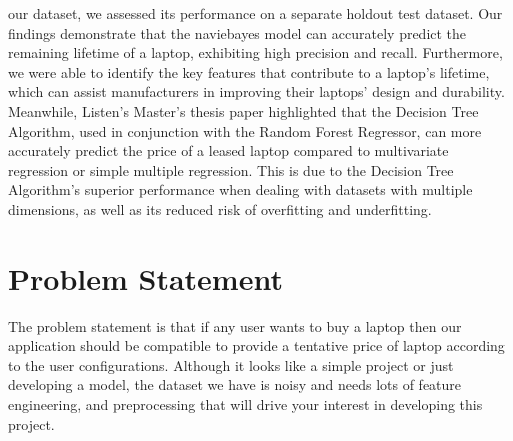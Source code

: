 \documentclass[
11pt, %
english, %
singlespacing, %
headsepline, %
]{MastersDoctoralThesis} %
\begin{document}
our dataset, we assessed its performance on a separate holdout test dataset. Our findings demonstrate that the naviebayes model can accurately predict 
the remaining lifetime of a laptop, exhibiting high precision and recall. Furthermore, we were able to identify the key features that contribute to a laptop's 
lifetime, which can assist manufacturers in improving their laptops' design and durability. Meanwhile, Listen's Master's thesis paper highlighted that the 
Decision Tree Algorithm, used in conjunction with the Random Forest Regressor, can more accurately predict the price of a leased laptop compared to 
multivariate regression or simple multiple regression. This is due to the Decision Tree Algorithm's superior performance when dealing with datasets with 
multiple dimensions, as well as its reduced risk of overfitting and underfitting.


\chapter{Problem Statement}
The problem statement is that if any user wants to buy a laptop then our application should be compatible to provide a tentative price of laptop according to the user configurations. Although it looks like a simple project or just developing a model, the dataset we have is noisy and needs lots of feature engineering, and preprocessing that will drive your interest in developing this project.\hfill\break\break
\end{document}
